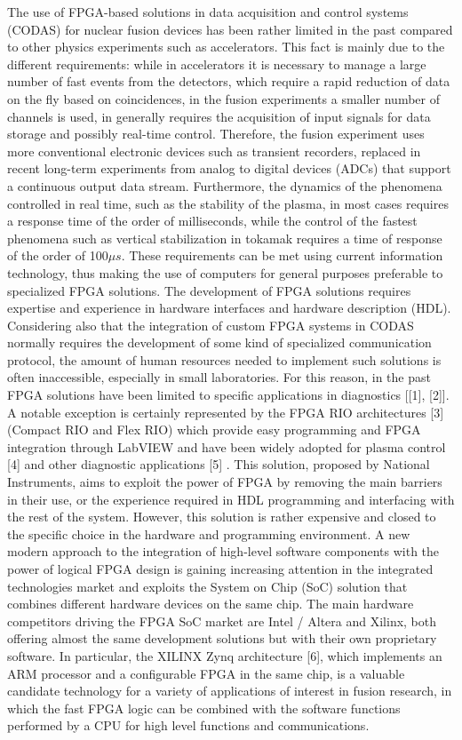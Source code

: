 \cite{RIGONI2018122}
The use of FPGA-based solutions in data acquisition and control systems (CODAS) for nuclear fusion devices has been rather limited in the past compared to other physics experiments such as accelerators. This fact is mainly due to the different requirements: while in accelerators it is necessary to manage a large number of fast events from the detectors, which require a rapid reduction of data on the fly based on coincidences, in the fusion experiments a smaller number of channels is used, in generally requires the acquisition of input signals for data storage and possibly real-time control. Therefore, the fusion experiment uses more conventional electronic devices such as transient recorders, replaced in recent long-term experiments from analog to digital devices (ADCs) that support a continuous output data stream. Furthermore, the dynamics of the phenomena controlled in real time, such as the stability of the plasma, in most cases requires a response time of the order of milliseconds, while the control of the fastest phenomena such as vertical stabilization in tokamak requires a time of response of the order of 100$\mu s$. These requirements can be met using current information technology, thus making the use of computers for general purposes preferable to specialized FPGA solutions. The development of FPGA solutions requires expertise and experience in hardware interfaces and hardware description (HDL). Considering also that the integration of custom FPGA systems in CODAS normally requires the development of some kind of specialized communication protocol, the amount of human resources needed to implement such solutions is often inaccessible, especially in small laboratories. For this reason, in the past FPGA solutions have been limited to specific applications in diagnostics [[1], [2]]. A notable exception is certainly represented by the FPGA RIO architectures [3] (Compact RIO and Flex RIO) which provide easy programming and FPGA integration through LabVIEW and have been widely adopted for plasma control [4] and other diagnostic applications [5] . This solution, proposed by National Instruments, aims to exploit the power of FPGA by removing the main barriers in their use, or the experience required in HDL programming and interfacing with the rest of the system. However, this solution is rather expensive and closed to the specific choice in the hardware and programming environment. A new modern approach to the integration of high-level software components with the power of logical FPGA design is gaining increasing attention in the integrated technologies market and exploits the System on Chip (SoC) solution that combines different hardware devices on the same chip. The main hardware competitors driving the FPGA SoC market are Intel / Altera and Xilinx, both offering almost the same development solutions but with their own proprietary software. In particular, the XILINX Zynq architecture [6], which implements an ARM processor and a configurable FPGA in the same chip, is a valuable candidate technology for a variety of applications of interest in fusion research, in which the fast FPGA logic can be combined with the software functions performed by a CPU for high level functions and communications.

